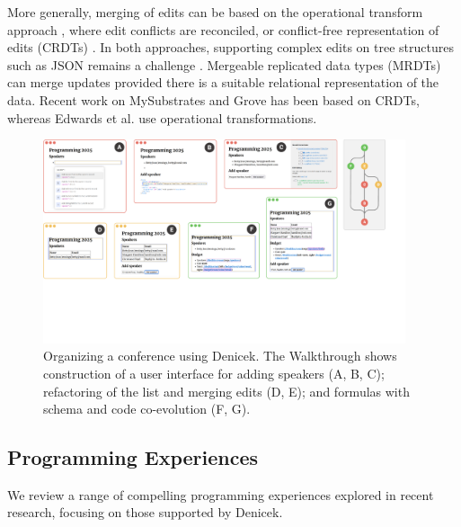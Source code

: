 \documentclass[sigconf,anonymous,screen]{acmart}
\begin{document}
More generally, merging of edits can be based on the operational transform approach
\cite{davis-2002-otsgml}, where edit conflicts are reconciled,
or conflict-free representation of edits (CRDTs) \cite{kleppmann-2019-local,litt-2022-peritext}.
In both approaches, supporting complex edits on tree structures such as JSON
remains a challenge \cite{jungnickel-2016-otjson,da-2024-jsoncrdt}. Mergeable replicated data
types (MRDTs) \cite{kaki-2019-mrdts} can merge updates provided there is a suitable relational
representation of the data. Recent work on MySubstrates and Grove \cite{adams-2025-grove,klokmose-2024-mywebstrates}
has been based on CRDTs, whereas Edwards et al. \cite{edwards-2021-typed} use operational
transformations.


\begin{figure}[t]
\includegraphics[width=0.95\textwidth,clip,trim=0cm 6cm 1.7cm 0cm]{fig/walkthrough.pdf}
\caption{Organizing a conference using Denicek. The Walkthrough shows construction of a user
  interface for adding speakers (A, B, C); refactoring of the list and merging edits (D, E); and
  formulas with schema and code co-evolution (F, G).}
\label{fig:walkthrough}
\end{figure}


\subsection{Programming Experiences}
\label{sec:background-exp}

We review a range of compelling programming experiences explored in recent research,
focusing on those supported by Denicek.
\end{document}
